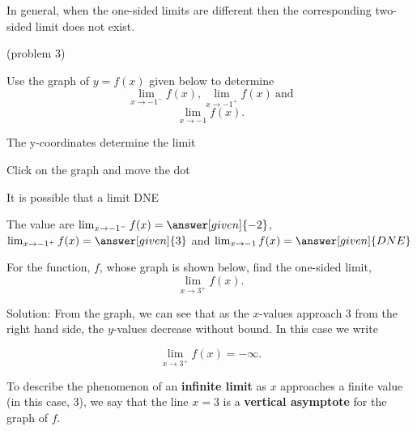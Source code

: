 \documentclass{ximera}
\begin{document}
In general, when the one-sided limits are different then the 
corresponding two-sided limit does not exist.

\begin{problem}(problem 3)


  Use the graph of $y = f(x)$ given below to determine
  \[
  \lim_{x\to -1^-} f(x), \lim_{x\to -1^+} f(x) \ \text{and}
	\]
	\[
	\lim_{x\to -1} f(x).
	\]
  
  
    \begin{hint}
      The y-coordinates determine the limit
    \end{hint}
		\begin{hint}
		  Click on the graph and move the dot
		\end{hint}
		\begin{hint}
		  It is possible that a limit DNE
		\end{hint}
		The value are $\lim_{x\to -1^-} f(x)=\answer[given]{-2}$, 
		$\lim_{x\to -1^+} f(x)=\answer[given]{3}$ and 
		$\lim_{x\to -1} f(x)=\answer[given]{DNE}$



	
\end{problem}


\begin{example}[example 4]
For the function, $f$, whose graph is shown below, find the one-sided limit,
\[
\lim_{x \to 3^+}f(x).
\]




\vspace{.25in}
Solution: From the graph, we can see that as the $x$-values approach 3 from the right hand side, the $y$-values decrease without bound.  In this case we write

\[
\lim_{x \to 3^+}f(x) = -\infty.
\]

To describe the phenomenon of an \textbf{infinite limit} as $x$ approaches a finite value (in this case, 3), 
we say that the line $x = 3$ is a \textbf{vertical asymptote} for the graph of $f$.

\end{example}
\end{document}
